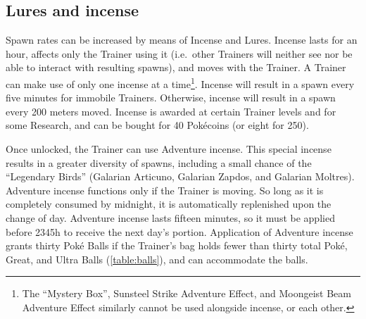\subsection{Lures and incense}
\label{subsec:lures}
Spawn rates can be increased by means of Incense and Lures.
Incense lasts for an hour, affects only the Trainer using it (i.e.\ other Trainers
  will neither see nor be able to interact with resulting spawns),
  and moves with the Trainer.
A Trainer can make use of only one incense at a time\footnote{The
  ``Mystery Box'', Sunsteel Strike Adventure Effect, and
  Moongeist Beam Adventure Effect similarly cannot be used
  alongside incense, or each other.}.
Incense will result in a spawn every five minutes for immobile Trainers.
Otherwise, incense will result in a spawn every 200 meters moved.
Incense is awarded at certain Trainer levels and for some Research,
  and can be bought for 40 Pokécoins (or eight for 250).

Once unlocked, the Trainer can use Adventure incense.
This special incense results in a greater diversity of spawns, including
  a small chance of the ``Legendary Birds''
  (Galarian Articuno, Galarian Zapdos, and Galarian Moltres).
Adventure incense functions only if the Trainer is moving.
So long as it is completely consumed by midnight, it is automatically replenished
  upon the change of day.
Adventure incense lasts fifteen minutes, so it must be applied before 2345h
  to receive the next day's portion.
Application of Adventure incense grants thirty Poké Balls if the Trainer's
  bag holds fewer than thirty total Poké, Great, and Ultra Balls (\autoref{table:balls}),
  and can accommodate the balls.

